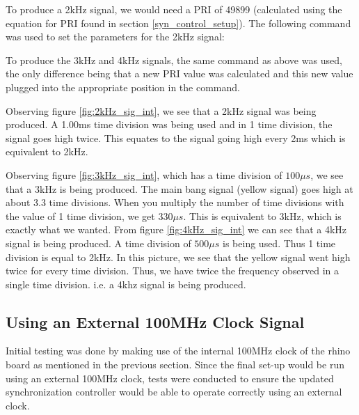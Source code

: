 \documentclass[12pt, a4paper]{article}
\begin{document}
To produce a 2kHz signal, we would need a PRI of 49899 (calculated using the equation for PRI found in section \ref{syn_control_setup}). The following command was used to set the parameters for the 2kHz signal:
	
		
To produce the 3kHz and 4kHz signals, the same command as above was used, the only difference being that a new PRI value was calculated and this new value plugged into the appropriate position in the command.

Observing figure \ref{fig:2kHz_sig_int}, we see that a 2kHz signal was being produced. A 1.00ms time division was being used and in 1 time division, the signal goes high twice. This equates to the signal going high every 2ms which is equivalent to 2kHz. 


Observing figure \ref{fig:3kHz_sig_int}, which has a time division of \( 100\mu s\), we see that a 3kHz is being produced. The main bang signal (yellow signal) goes high at about 3.3 time divisions. When you multiply the number of time divisions with the value of 1 time division, we get \(330\mu s\). This is equivalent to 3kHz, which is exactly what we wanted. From figure \ref{fig:4kHz_sig_int} we can see that a 4kHz signal is being produced. A time division of \(500\mu s\) is being used. Thus 1 time division is equal to 2kHz. In this picture, we see that the yellow signal went high twice for every time division. Thus, we have twice the frequency observed in a single time division. i.e. a 4khz signal is being produced.


\subsection{Using an External 100MHz Clock Signal}

Initial testing was done by making use of the internal 100MHz clock of the rhino board as mentioned in the previous section. Since the final set-up would be run using an external 100MHz clock, tests were conducted to ensure the updated synchronization controller would be able to operate correctly using an external clock.
\end{document}
